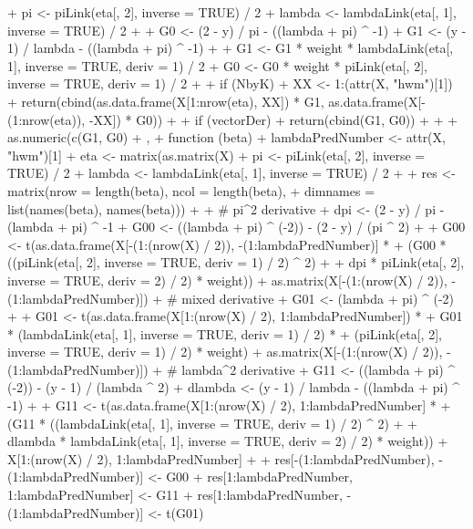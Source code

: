\documentclass[
]{jss}
\newcommand{\1}{\mathcal{I}} \newcommand{\bx}{\boldsymbol{x}}
\begin{document}
\begin{CodeChunk}
\begin{CodeInput}
{{{+         pi     <-     piLink(eta[, 2], inverse = TRUE) / 2
+         lambda <- lambdaLink(eta[, 1], inverse = TRUE) / 2
+         
+         G0 <- (2 - y) / pi     - ((lambda + pi) ^ -1)
+         G1 <- (y - 1) / lambda - ((lambda + pi) ^ -1)
+         
+         G1 <- G1 * weight * lambdaLink(eta[, 1], inverse = TRUE, deriv = 1) / 2
+         G0 <- G0 * weight *     piLink(eta[, 2], inverse = TRUE, deriv = 1) / 2
+         
+         if (NbyK) {
+           XX <- 1:(attr(X, "hwm")[1])
+           return(cbind(as.data.frame(X[1:nrow(eta), XX]) * G1, as.data.frame(X[-(1:nrow(eta)), -XX]) * G0))
+         }
+         if (vectorDer) {
+           return(cbind(G1, G0))
+         }
+         
+         as.numeric(c(G1, G0) %
+       },
+       function (beta) {
+         lambdaPredNumber <- attr(X, "hwm")[1]
+         eta <- matrix(as.matrix(X) %
+         pi     <-     piLink(eta[, 2], inverse = TRUE) / 2
+         lambda <- lambdaLink(eta[, 1], inverse = TRUE) / 2
+ 
+         res <- matrix(nrow = length(beta), ncol = length(beta), 
+                       dimnames = list(names(beta), names(beta)))
+         
+         # pi^2 derivative
+         dpi <- (2 - y) / pi - (lambda + pi) ^ -1
+         G00 <- ((lambda + pi) ^ (-2)) - (2 - y) / (pi ^ 2)
+         
+         G00 <- t(as.data.frame(X[-(1:(nrow(X) / 2)), -(1:lambdaPredNumber)] * 
+         (G00 * ((piLink(eta[, 2], inverse = TRUE, deriv = 1) / 2) ^ 2) + 
+         dpi * piLink(eta[, 2], inverse = TRUE, deriv = 2) / 2) * weight)) %
+         as.matrix(X[-(1:(nrow(X) / 2)), -(1:lambdaPredNumber)])
+         # mixed derivative
+         G01 <- (lambda + pi) ^ (-2)
+         
+         G01 <- t(as.data.frame(X[1:(nrow(X) / 2), 1:lambdaPredNumber]) * 
+         G01 * (lambdaLink(eta[, 1], inverse = TRUE, deriv = 1) / 2) * 
+         (piLink(eta[, 2], inverse = TRUE, deriv = 1) / 2) * weight) %
+         as.matrix(X[-(1:(nrow(X) / 2)), -(1:lambdaPredNumber)])
+         # lambda^2 derivative
+         G11 <- ((lambda + pi) ^ (-2)) - (y - 1) / (lambda ^ 2)
+         dlambda <- (y - 1) / lambda - ((lambda + pi) ^ -1)
+         
+         G11 <- t(as.data.frame(X[1:(nrow(X) / 2), 1:lambdaPredNumber] * 
+         (G11 * ((lambdaLink(eta[, 1], inverse = TRUE, deriv = 1) / 2) ^ 2) + 
+         dlambda * lambdaLink(eta[, 1], inverse = TRUE, deriv = 2) / 2) * weight)) %
+         X[1:(nrow(X) / 2), 1:lambdaPredNumber]
+         
+         res[-(1:lambdaPredNumber), -(1:lambdaPredNumber)] <- G00
+         res[1:lambdaPredNumber, 1:lambdaPredNumber] <- G11
+         res[1:lambdaPredNumber, -(1:lambdaPredNumber)] <- t(G01)
}}}
\end{CodeInput}
\end{CodeChunk}
\end{document}
